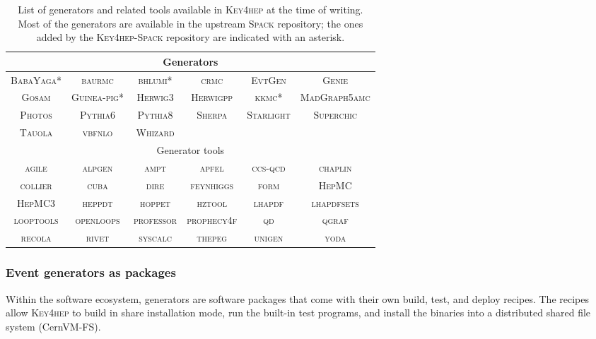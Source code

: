 \begin{table}[ht]
\centering
\caption{List of generators and related tools available in \textsc{Key4hep} at the time of writing. 
Most of the generators are available in the upstream \textsc{Spack} repository; 
the ones added by the \textsc{Key4hep-Spack} repository are indicated with an asterisk.}
\label{tab:genlist}
\begin{tabular}{cccccc}
\toprule
\multicolumn{6}{c}{Generators} \\ \midrule
\textsc{BabaYaga}* & \textsc{baurmc} & \textsc{bhlumi}* & \textsc{crmc} & \textsc{EvtGen} & \textsc{Genie} \\
\textsc{Gosam} & \textsc{Guinea-pig}* & \textsc{Herwig3} & \textsc{Herwigpp} & \textsc{kkmc}* & \textsc{MadGraph5amc} \\
\textsc{Photos} & \textsc{Pythia6} & \textsc{Pythia8} & \textsc{Sherpa} & \textsc{Starlight} & \textsc{Superchic} \\
\textsc{Tauola} & \textsc{vbfnlo} & \textsc{Whizard} &  & & \\ \toprule
\multicolumn{6}{c}{Generator tools} \\ \midrule
\textsc{agile} & \textsc{alpgen} & \textsc{ampt} & \textsc{apfel} & \textsc{ccs-qcd} & \textsc{chaplin} \\
\textsc{collier} & \textsc{cuba} & \textsc{dire} & \textsc{feynhiggs} & \textsc{form} & \textsc{HepMC} \\
\textsc{HepMC3} & \textsc{heppdt} & \textsc{hoppet} & \textsc{hztool} & \textsc{lhapdf} & \textsc{lhapdfsets} \\
\textsc{looptools} & \textsc{openloops} & \textsc{professor} & \textsc{prophecy4f} & \textsc{qd} & \textsc{qgraf} \\
\textsc{recola} & \textsc{rivet} & \textsc{syscalc} & \textsc{thepeg} & \textsc{unigen} & \textsc{yoda} \\
\bottomrule
\end{tabular}
\end{table}

\subsubsection{Event generators as packages}

Within the software ecosystem, generators are software packages that come with their own build, test, and deploy recipes. 
The recipes allow \textsc{Key4hep} to build in share installation mode, run the built-in test programs, 
and install the binaries into a distributed shared file system (CernVM-FS).

